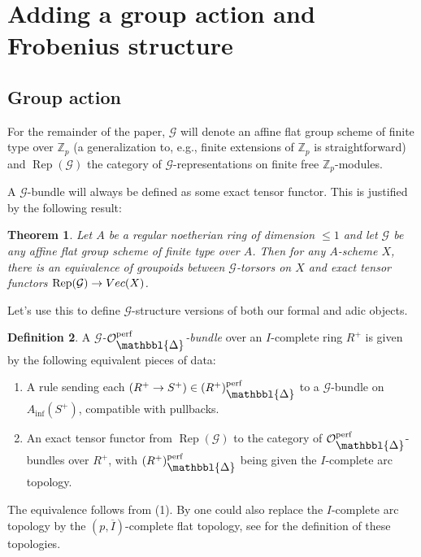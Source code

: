 \documentclass[10pt,twoside]{article}
\numberwithin{equation}{section}
\theoremstyle{plain}
\newtheorem{mythm}{Theorem}[section]
\theoremstyle{definition}
\newtheorem{mydef}[mythm]{Definition}
\DeclareMathOperator{\Rep}{Rep}
\newcommand{\ZZ}{\mathbb{Z}}
\newcommand{\MCG}{\mathcal{G}}
\newcommand{\MCO}{\mathcal{O}}
\DeclareMathOperator{\perf}{perf}
\newcommand{\Prism}{{\mathlarger{\mathbbl{\Delta}}}}
\DeclareMathOperator{\Inf}{inf}
\newcommand{\Ainf}{A_{\Inf}}
\newcommand{\OpP}{\MCO^{\perf}_{\Prism}}
\begin{document}
\section{Adding a group action and Frobenius structure}
\subsection{Group action}
For the remainder of the paper, \(\MCG\) will denote an affine flat group scheme of finite type over \(\ZZ_p\) (a generalization to, e.g., finite extensions of \(\ZZ_p\) is straightforward) and \(\Rep(\MCG)\) the category of \(\MCG\)-representations on finite free \(\ZZ_p\)-modules.

A \(\MCG\)-bundle will always be defined as some exact tensor functor. This is justified by the following result:


\begin{mythm}\emph{\cite[Example 1.7 (1), Proposition 1.6]{Wed23}}
Let \(A\) be a regular noetherian ring of dimension \(\leq 1\) and let \(\MCG\) be any affine flat group scheme of finite type over \(A\). Then for any \(A\)-scheme \(X\), there is an equivalence of groupoids between \(\MCG\)-torsors on \(X\) and exact tensor functors \(\Rep(\MCG)\to \emph{Vec}(X)\).
\end{mythm}


Let's use this to define \(\MCG\)-structure versions of both our formal and adic objects.


\begin{mydef}\label{defGCrys}
A \emph{\(\MCG\)-\(\OpP\)-bundle} over an \(I\)-complete ring \(R^+\) is given by the following equivalent pieces of data:
\begin{enumerate}
    \item A rule sending each \((R^+\to S^+)\in (R^+)_{\Prism}^{\perf}\) to a \(\MCG\)-bundle on \(\Ainf(S^+)\), compatible with pullbacks.
    \item An exact tensor functor from \(\Rep(\MCG)\) to the category of \(\OpP\)-bundles over \(R^+\), with \((R^+)_{\Prism}^{\perf}\) being given the \(I\)-complete arc topology.
\end{enumerate}
\end{mydef}

The equivalence follows from (1). By  one could also replace the \(I\)-complete arc topology by the \((p, \overline I)\)-complete flat topology, see  for the definition of these topologies.
\end{document}
